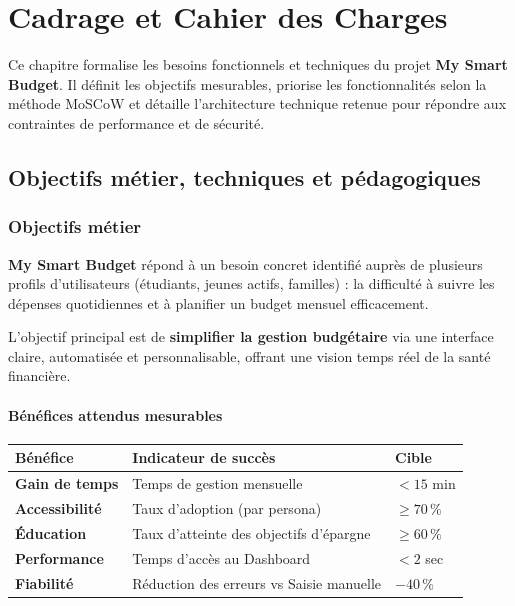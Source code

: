 \chapter{Cadrage et Cahier des Charges}

Ce chapitre formalise les besoins fonctionnels et techniques du projet \textbf{My Smart Budget}. Il définit les objectifs mesurables, priorise les fonctionnalités selon la méthode MoSCoW et détaille l'architecture technique retenue pour répondre aux contraintes de performance et de sécurité.

\section{Objectifs métier, techniques et pédagogiques}

\subsection{Objectifs métier}

\textbf{My Smart Budget} répond à un besoin concret identifié auprès de plusieurs profils d'utilisateurs (étudiants, jeunes actifs, familles) : la difficulté à suivre les dépenses quotidiennes et à planifier un budget mensuel efficacement.

L'objectif principal est de \textbf{simplifier la gestion budgétaire} via une interface claire, automatisée et personnalisable, offrant une vision temps réel de la santé financière.

\subsubsection{Bénéfices attendus mesurables}

\begin{center}
\small
\begin{tabular}{|p{}|p{}|p{}|}
\hline
\textbf{Bénéfice} & \textbf{Indicateur de succès} & \textbf{Cible} \\
\hline
\textbf{Gain de temps} & Temps de gestion mensuelle & $< 15$ min \\
\hline
\textbf{Accessibilité} & Taux d'adoption (par persona) & $\geq 70\,\%$ \\
\hline
\textbf{Éducation} & Taux d'atteinte des objectifs d'épargne & $\geq 60\,\%$ \\
\hline
\textbf{Performance} & Temps d'accès au Dashboard & $< 2$ sec \\
\hline
\textbf{Fiabilité} & Réduction des erreurs vs Saisie manuelle & $-40\,\%$ \\
\hline
\end{tabular}
\end{center}

